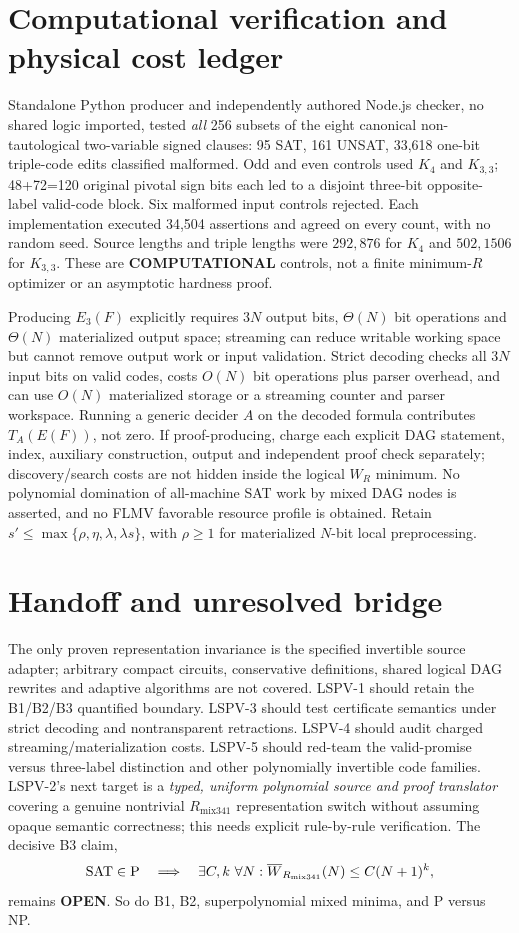 \documentclass[11pt]{article}
\begin{document}
\section*{Computational verification and physical cost ledger}
Standalone Python producer and independently authored Node.js checker, no shared logic imported, tested \emph{all} 256 subsets of the eight canonical non-tautological two-variable signed clauses: 95 SAT, 161 UNSAT, 33,618 one-bit triple-code edits classified malformed. Odd and even controls used \(K_4\) and \(K_{3,3}\); 48+72=120 original pivotal sign bits each led to a disjoint three-bit opposite-label valid-code block. Six malformed input controls rejected. Each implementation executed 34,504 assertions and agreed on every count, with no random seed. Source lengths and triple lengths were \(292,876\) for \(K_4\) and \(502,1506\) for \(K_{3,3}\). These are \textbf{COMPUTATIONAL} controls, not a finite minimum-\(R\) optimizer or an asymptotic hardness proof.

Producing \(E_3(F)\) explicitly requires \(3N\) output bits, \(\Theta(N)\) bit operations and \(\Theta(N)\) materialized output space; streaming can reduce writable working space but cannot remove output work or input validation. Strict decoding checks all \(3N\) input bits on valid codes, costs \(O(N)\) bit operations plus parser overhead, and can use \(O(N)\) materialized storage or a streaming counter and parser workspace. Running a generic decider \(A\) on the decoded formula contributes \(T_A(E(F))\), not zero. If proof-producing, charge each explicit DAG statement, index, auxiliary construction, output and independent proof check separately; discovery/search costs are not hidden inside the logical \(W_R\) minimum. No polynomial domination of all-machine SAT work by mixed DAG nodes is asserted, and no FLMV favorable resource profile is obtained. Retain \(s'\le\max\{\rho,\eta,\lambda,\lambda s\}\), with \(\rho\ge1\) for materialized \(N\)-bit local preprocessing.

\section*{Handoff and unresolved bridge}
The only proven representation invariance is the specified invertible source adapter; arbitrary compact circuits, conservative definitions, shared logical DAG rewrites and adaptive algorithms are not covered. LSPV-1 should retain the B1/B2/B3 quantified boundary. LSPV-3 should test certificate semantics under strict decoding and nontransparent retractions. LSPV-4 should audit charged streaming/materialization costs. LSPV-5 should red-team the valid-promise versus three-label distinction and other polynomially invertible code families. LSPV-2's next target is a \emph{typed, uniform polynomial source and proof translator} covering a genuine nontrivial \(R_{\mathrm{mix341}}\) representation switch without assuming opaque semantic correctness; this needs explicit rule-by-rule verification. The decisive B3 claim,
\[
{\rm SAT}\in{\rm P}\quad\Longrightarrow\quad
\exists C,k\ \forall N:\overline W_{R_{\mathrm{mix341}}}(N)\le C(N+1)^k,
\]
remains \textbf{OPEN}. So do B1, B2, superpolynomial mixed minima, and P versus NP.
\end{document}
